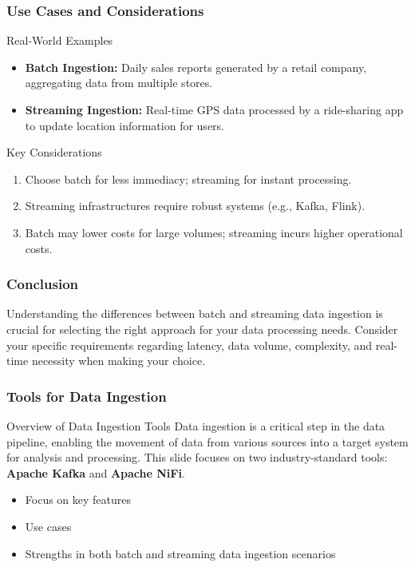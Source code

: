 \documentclass[aspectratio=169]{beamer}
\begin{document}
\begin{frame}[fragile]
    \frametitle{Use Cases and Considerations}
    \begin{block}{Real-World Examples}
        \begin{itemize}
            \item \textbf{Batch Ingestion:} Daily sales reports generated by a retail company, aggregating data from multiple stores.
            \item \textbf{Streaming Ingestion:} Real-time GPS data processed by a ride-sharing app to update location information for users.
        \end{itemize}
    \end{block}
    
    \begin{block}{Key Considerations}
        \begin{enumerate}
            \item Choose batch for less immediacy; streaming for instant processing.
            \item Streaming infrastructures require robust systems (e.g., Kafka, Flink).
            \item Batch may lower costs for large volumes; streaming incurs higher operational costs.
        \end{enumerate}
    \end{block}
\end{frame}

\begin{frame}[fragile]
    \frametitle{Conclusion}
    Understanding the differences between batch and streaming data ingestion is crucial for selecting the right approach for your data processing needs. Consider your specific requirements regarding latency, data volume, complexity, and real-time necessity when making your choice.
\end{frame}

\begin{frame}[fragile]
    \frametitle{Tools for Data Ingestion}
    
    \begin{block}{Overview of Data Ingestion Tools}
        Data ingestion is a critical step in the data pipeline, enabling the movement of data from various sources into a target system for analysis and processing. This slide focuses on two industry-standard tools: \textbf{Apache Kafka} and \textbf{Apache NiFi}.
    \end{block}
    
    \begin{itemize}
        \item Focus on key features
        \item Use cases
        \item Strengths in both batch and streaming data ingestion scenarios
    \end{itemize}
\end{frame}
\end{document}
